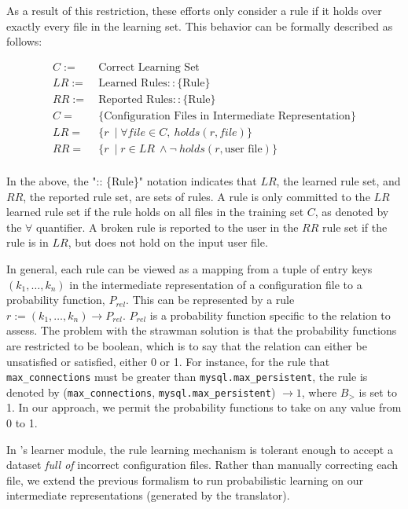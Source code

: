 As a result of this restriction, 
these efforts only consider a rule if it holds over exactly every file in 
the learning set. This behavior can be formally described as follows:
\begin{small}
\begin{align*}
C :=&\ \text{Correct Learning Set}\\
LR :=&\ \text{Learned Rules} :: \{\textrm{Rule}\}\\
RR :=&\ \text{Reported Rules} :: \{\textrm{Rule}\}\\ 
C =&\ \text{\{Configuration Files in Intermediate Representation\}}\\
LR =&\ \{ r\ \mid \forall file \in C,\ holds(r,file)\} \\
RR =&\ \{ r\ \mid r \in LR \ \land \neg\ holds(r,\textrm{user file}) \}\\
\end{align*}
\end{small}
In the above, the ":: \{Rule\}" notation indicates that $LR$, the learned rule set, 
and $RR$, the reported rule set, are sets of rules.
A rule is only committed to the $LR$ learned rule set if 
the rule holds on all files in the training set $C$, as denoted by the $\forall$ quantifier. 
A broken rule is reported to the user in the $RR$ rule set if the rule is in $LR$, 
but does not hold on the input user file.

In general, each rule can be viewed as a mapping from a tuple of 
entry keys $(k_1, \ldots, k_n)$ in the intermediate representation of a 
configuration file to a probability function, $P_{rel}$. This can be represented by a rule
$r := (k_1, \ldots, k_n) \rightarrow P_{rel}$.
$P_{rel}$ is a probability function specific to the relation to assess.
The problem with the strawman solution is that the probability functions are restricted to be 
boolean, which is to say that the relation can either be unsatisfied or satisfied, either 0 or 1. 
For instance, for the rule that {\tt max\_connections} must 
be greater than {\tt mysql.max\_persistent}, the rule is denoted by
({\tt max\_connections}, {\tt mysql.max\_persistent}) $\to 1$, where 
$B_{>}$ is set to 1. In our approach, we permit the probability functions to take on any value from 0 to 1.

In \app's learner module, the rule learning mechanism is tolerant 
enough to accept a dataset {\em full of} incorrect configuration files. 
Rather than manually correcting each file, 
we extend the previous formalism to run probabilistic learning
on our intermediate representations (generated by the translator). 

